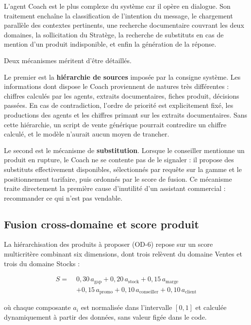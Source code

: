 L'agent Coach est le plus complexe du système car il opère en dialogue. Son traitement enchaîne la classification de l'intention du message, le chargement parallèle des contextes pertinents, une recherche documentaire couvrant les deux domaines, la sollicitation du Stratège, la recherche de substituts en cas de mention d'un produit indisponible, et enfin la génération de la réponse.

Deux mécanismes méritent d'être détaillés.

Le premier est la \textbf{hiérarchie de sources} imposée par la consigne système. Les informations dont dispose le Coach proviennent de natures très différentes : chiffres calculés par les agents, extraits documentaires, fiches produit, décisions passées. En cas de contradiction, l'ordre de priorité est explicitement fixé, les productions des agents et les chiffres primant sur les extraits documentaires. Sans cette hiérarchie, un script de vente générique pourrait contredire un chiffre calculé, et le modèle n'aurait aucun moyen de trancher.

Le second est le mécanisme de \textbf{substitution}. Lorsque le conseiller mentionne un produit en rupture, le Coach ne se contente pas de le signaler : il propose des substituts effectivement disponibles, sélectionnés par requête sur la gamme et le positionnement tarifaire, puis ordonnés par le score de fusion. Ce mécanisme traite directement la première cause d'inutilité d'un assistant commercial : recommander ce qui n'est pas vendable.

\subsection{Fusion cross-domaine et score produit}

La hiérarchisation des produits à proposer (OD-6) repose sur un score multicritère combinant six dimensions, dont trois relèvent du domaine Ventes et trois du domaine Stocks :

\begin{equation}
\begin{split}
S = \; & 0{,}30\, a_{\text{gap}} + 0{,}20\, a_{\text{stock}} + 0{,}15\, a_{\text{marge}} \\
       & + 0{,}15\, a_{\text{promo}} + 0{,}10\, a_{\text{conseiller}} + 0{,}10\, a_{\text{client}}
\end{split}
\end{equation}

où chaque composante $a_i$ est normalisée dans l'intervalle $[0,1]$ et calculée dynamiquement à partir des données, sans valeur figée dans le code.

